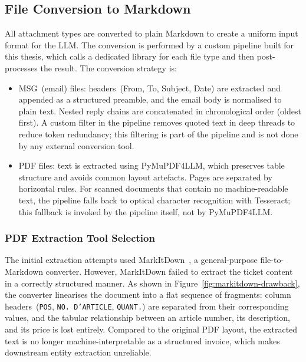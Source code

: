 \subsection{File Conversion to Markdown}
%
All attachment types are converted to plain Markdown to create a uniform
input format for the LLM.  The conversion is performed by a custom pipeline
built for this thesis, which calls a dedicated library for each file type and
then post-processes the result.  The conversion strategy is:

\begin{itemize}
    \item MSG~(email) files: headers~(From, To, Subject, Date)
          are extracted and appended as a structured preamble, and the email body
          is normalised to plain text.  Nested reply chains are concatenated
          in chronological order (oldest first).  A custom filter in the
          pipeline removes quoted text in deep threads to reduce token
          redundancy; this filtering is part of the pipeline and is not done by
          any external conversion tool.

    \item PDF files: text is extracted using PyMuPDF4LLM, which
          preserves table structure and avoids common layout artefacts.
          Pages are separated by horizontal rules.  For scanned documents that
          contain no machine-readable text, the pipeline falls back to optical
          character recognition with Tesseract; this fallback is invoked by the
          pipeline itself, not by PyMuPDF4LLM.
\end{itemize}

\subsubsection{PDF Extraction Tool Selection}
%
The initial extraction attempts used MarkItDown~\cite{markitdown2024},
a general-purpose file-to-Markdown converter.  However, MarkItDown failed to
extract the ticket content in a correctly structured manner.  As shown in
Figure~\ref{fig:markitdown-drawback}, the converter linearises the document
into a flat sequence of fragments: column headers~(\texttt{POS},
\texttt{NO.\,D'ARTICLE}, \texttt{QUANT.}) are separated from their
corresponding values, and the tabular relationship between an article number,
its description, and its price is lost entirely.  Compared to the original PDF
layout, the extracted text is no longer
machine-interpretable as a structured invoice, which makes downstream entity
extraction unreliable.

